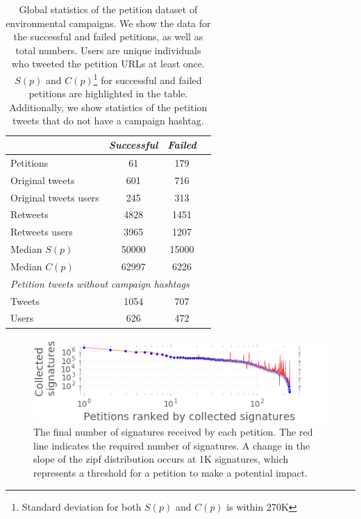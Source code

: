 \begin{table}[hbt!]
\centering
\begin{tabular}{lccc}
			& \textit{Successful} & \textit{Failed}	\\ \midrule
Petitions					& 61		& 179		\\
Original tweets				& 601		& 716		\\
Original tweets users 		& 245		& 313		\\
Retweets						& 4828		& 1451 		\\
Retweets users				& 3965		& 1207		\\
Median $S(p)$				& 50000		& 15000		\\
Median $C(p)$				& 62997		& 6226		\\
\multicolumn{3}{l}{\textit{Petition tweets without campaign hashtags}}	\\ \midrule
Tweets						& 1054		& 707		\\
Users 						& 626		& 472		\\
\end{tabular}
\caption{Global statistics of the petition dataset of environmental campaigns. We show the data for the successful and failed petitions, as well as total numbers. Users are unique individuals who tweeted the petition URLs at least once. $S(p)$ and $C(p)$\footnote{Standard deviation for both $S(p)$ and $C(p)$ is within 270K} for successful and failed petitions are highlighted in the table. Additionally, we show statistics of the petition tweets that do not have a campaign hashtag.}
\label{tab:petition_tweets}
\end{table}

\begin{figure}
\centering
\includegraphics[width=\columnwidth]{figures/petitionsVSrank.png}
\caption{The final number of signatures received by each petition. The red line indicates the required number of signatures. A change in the slope of the zipf distribution occurs at 1K signatures, which represents a threshold for a petition to make a potential impact.}
\label{fig:signatures_vs_rank}
\end{figure}

